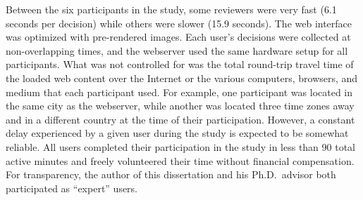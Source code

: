 Between the six participants in the study, some reviewers were very fast (6.1 seconds per decision) while others were slower (15.9 seconds).  The web interface was optimized with pre-rendered images. Each user's decisions were collected at non-overlapping times, and the webserver used the same hardware setup for all participants.  What was not controlled for was the total round-trip travel time of the loaded web content over the Internet or the various computers, browsers, and medium that each participant used.  For example, one participant was located in the same city as the webserver, while another was located three time zones away and in a different country at the time of their participation.  However, a constant delay experienced by a given user during the study is expected to be somewhat reliable.  All users completed their participation in the study in less than 90 total active minutes and freely volunteered their time without financial compensation.  For transparency, the author of this dissertation and his Ph.D.\ advisor both participated as ``expert'' users.

